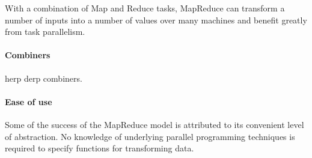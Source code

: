 With a combination of Map and Reduce tasks, MapReduce can transform a number of inputs into a number of values over many machines and benefit greatly from task parallelism.

\paragraph{Combiners}
herp derp combiners.

\paragraph{Ease of use}
Some of the success of the MapReduce model is attributed to its convenient level of abstraction. No knowledge of underlying parallel programming techniques is required to specify functions for transforming data.

